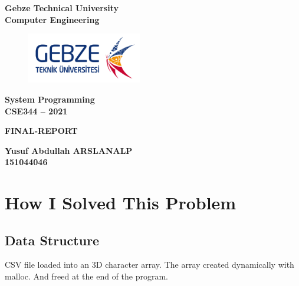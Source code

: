 \documentclass[10pt,english, openany]{book}
\begin{document}


\mainmatter


\begin{centering}

	{\LARGE \textbf{Gebze Technical University}} \\
	{\LARGE \textbf{Computer Engineering}} \\
	    \vspace{2.0cm}
	    
\begin{figure}[htp]
    \centering
    \includegraphics[width=5cm]{gtu_logo.png}
    
\end{figure}	    
	    
	    \vspace{2.0cm}
	    
	{\LARGE \textbf{System Programming}} \\
	{\LARGE \textbf{CSE344 – 2021}} \\
	    \vspace{3.0cm}
	
	{\LARGE \textbf{FINAL-REPORT}} \\
		\vspace{3.0cm}

	{\LARGE \textbf{Yusuf Abdullah ARSLANALP}} \\
	{\LARGE \textbf{151044046}} \\


\end{centering}



\newpage


\section{How I Solved This Problem}
\subsection{ Data Structure }
CSV file loaded into an 3D character array. The array created dynamically with malloc. And freed at the end of the program.
\end{document}
